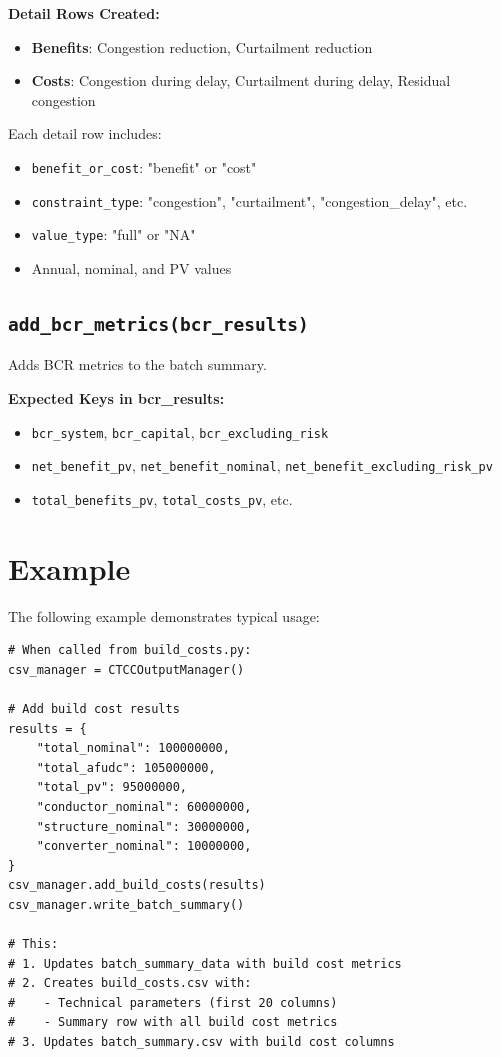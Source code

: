 \documentclass[ctcc_full_documentation.tex]{subfiles}
\begin{document}
\textbf{Detail Rows Created:}
\begin{itemize}
    \item \textbf{Benefits}: Congestion reduction, Curtailment reduction
    \item \textbf{Costs}: Congestion during delay, Curtailment during delay, Residual congestion
\end{itemize}

Each detail row includes:
\begin{itemize}
    \item \texttt{benefit\_or\_cost}: "benefit" or "cost"
    \item \texttt{constraint\_type}: "congestion", "curtailment", "congestion\_delay", etc.
    \item \texttt{value\_type}: "full" or "NA"
    \item Annual, nominal, and PV values
\end{itemize}

\subsection{\texttt{add\_bcr\_metrics(bcr\_results)}}

Adds BCR metrics to the batch summary.

\textbf{Expected Keys in bcr\_results:}
\begin{itemize}
    \item \texttt{bcr\_system}, \texttt{bcr\_capital}, \texttt{bcr\_excluding\_risk}
    \item \texttt{net\_benefit\_pv}, \texttt{net\_benefit\_nominal}, \texttt{net\_benefit\_excluding\_risk\_pv}
    \item \texttt{total\_benefits\_pv}, \texttt{total\_costs\_pv}, etc.
\end{itemize}

\section{Example}

The following example demonstrates typical usage:

\begin{lstlisting}
# When called from build_costs.py:
csv_manager = CTCCOutputManager()

# Add build cost results
results = {
    "total_nominal": 100000000,
    "total_afudc": 105000000,
    "total_pv": 95000000,
    "conductor_nominal": 60000000,
    "structure_nominal": 30000000,
    "converter_nominal": 10000000,
}
csv_manager.add_build_costs(results)
csv_manager.write_batch_summary()

# This:
# 1. Updates batch_summary_data with build cost metrics
# 2. Creates build_costs.csv with:
#    - Technical parameters (first 20 columns)
#    - Summary row with all build cost metrics
# 3. Updates batch_summary.csv with build cost columns
\end{lstlisting}
\end{document}
